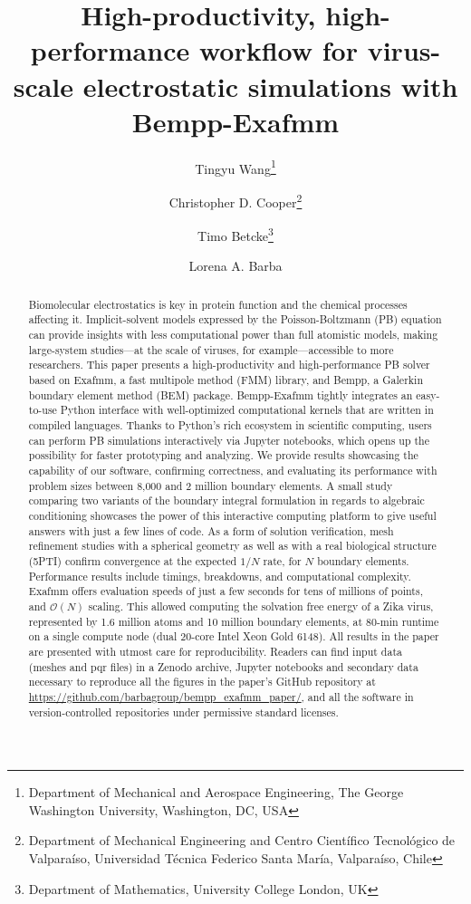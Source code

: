 \documentclass[twocolumn]{article}
\title{High-productivity, high-performance workflow for virus-scale electrostatic simulations with Bempp-Exafmm}
\author{%
    Tingyu Wang\thanks{Department of Mechanical and Aerospace Engineering, The George Washington University, Washington, DC, USA}%
    \and Christopher D. Cooper\thanks{Department of Mechanical Engineering and Centro Cient\'ifico Tecnol\'ogico de Valpara\'iso, Universidad T\'ecnica Federico Santa Mar\'ia, Valpara\'iso, Chile}%
    \and Timo Betcke\thanks{Department of Mathematics, University College London, UK}%
    \and Lorena A. Barba\samethanks[1]%
}
\begin{document}
\maketitle

\begin{abstract}
Biomolecular electrostatics is key in protein function and the chemical processes affecting it.
Implicit-solvent models expressed by the Poisson-Boltzmann (PB) equation can provide insights with less computational power than full atomistic models, making large-system studies---at the scale of viruses, for example---accessible to more researchers.
    This paper presents a high-productivity and high-performance PB solver based on Exafmm, a fast multipole method (FMM) library, and Bempp, a Galerkin boundary element method (BEM) package.
    Bempp-Exafmm tightly integrates an easy-to-use Python interface with well-optimized computational kernels that are written in compiled languages.
    Thanks to Python's rich ecosystem in scientific computing, users can perform PB simulations interactively via Jupyter notebooks, which opens up the possibility for faster prototyping and analyzing.
    We provide results showcasing the capability of our software, confirming correctness, and evaluating its performance with problem sizes between 8,000 and 2 million boundary elements.
    A small study comparing two variants of the boundary integral formulation in regards to algebraic conditioning showcases the power of this interactive computing platform to give useful answers with just a few lines of code.
    As a form of solution verification, mesh refinement studies with a spherical geometry as well as with a real biological structure (5PTI) confirm convergence at the expected $1/N$ rate, for $N$ boundary elements.
    Performance results include timings, breakdowns, and computational complexity.
    Exafmm offers evaluation speeds of just a few seconds for tens of millions of points, and $\mathcal{O}(N)$ scaling.
    This allowed computing the solvation free energy of a Zika virus, represented by 1.6 million atoms and 10 million boundary elements, at 80-min runtime on a single compute node (dual 20-core Intel Xeon Gold 6148).
    All results in the paper are presented with utmost care for reproducibility. 
    Readers can find input data (meshes and pqr files) in a Zenodo archive, Jupyter notebooks and secondary data necessary to reproduce all the figures in the paper's GitHub repository at \url{https://github.com/barbagroup/bempp_exafmm_paper/}, and all the software in version-controlled repositories under permissive standard licenses.

\end{abstract}
\end{document}

